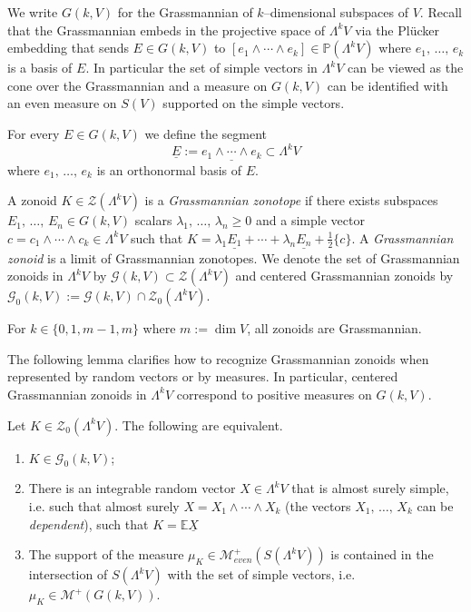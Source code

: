 \documentclass[AHL, Unicode, longabstracts, published]{cedram}
\newcommand{\PP}{\mathbb{P}}
\newcommand{\EE}{\mathbb{E}}
\newcommand{\ZZ}{\mathscr{Z}}
\newcommand{\ZZo}{\mathscr{Z}_0}
\newcommand{\Me}{\mathcal{M}}
\newcommand{\Mev}{\mathcal{M}_{even}}
\newcommand{\GZ}{\mathcal{G}}
\newcommand{\GZo}{\mathcal{G}_0}
\newcommand{\seg}{\underline}
\newcommand*{\romanenumi}{\renewcommand*{\theenumi}{\roman{enumi}}}
\begin{document}
We write $G(k,V)$ for the Grassmannian of $k$--dimensional subspaces of $V$. Recall that the Grassmannian embeds in the projective space of $\Lambda^kV$ via the Pl\"ucker embedding that sends $E\in G(k,V)$ to $[e_1\wedge\cdots\wedge e_k]\in\PP(\Lambda^kV)$ where $e_1,\,\ldots,\,e_k$ is a basis of $E.$ In particular the set of simple vectors in $\Lambda^kV$ can be viewed as the cone over the Grassmannian and a measure on $G(k,V)$ can be identified with an even measure on $S(V)$ supported on the simple vectors.

For every $E\in G(k,V)$ we define the segment
\begin{equation*}
\seg{E}:=\seg{e_1\wedge\cdots\wedge e_k}\subset\Lambda^k V
\end{equation*}
where $e_1,\,\ldots,\,e_k$ is an orthonormal basis of $E.$

\begin{defi}
A zonoid $K\in\ZZ(\Lambda^k V)$ is a \emph{Grassmannian zonotope} if there exists subspaces $E_1,\,\ldots,\,E_n\in G(k,V)$ scalars $\lambda_1,\,\ldots,\,\lambda_n\geq 0$ and a simple vector $c=c_1\wedge\cdots\wedge c_k\in\Lambda^k V$ such that $K=\lambda_1\seg{E_1}+\cdots+\lambda_n\seg{E_n}+\tfrac{1}{2}\{c\}$. A \emph{Grassmannian zonoid} is a limit of Grassmannian zonotopes. We denote the set of Grassmannian zonoids in $\Lambda^k V$ by $\GZ(k,V)\subset \ZZ(\Lambda^k V)$ and centered Grassmannian zonoids by $\GZo(k,V):=\GZ(k,V)\cap \ZZo(\Lambda^k V)$.
\end{defi}

\begin{rema}
For $k\in\{0,1,m-1,m\}$ where $m:=\dim V$, all zonoids are Grassmannian.
\end{rema}



The following lemma clarifies how to recognize Grassmannian zonoids when represented by random vectors or by measures. In particular, centered Grassmannian zonoids in $\Lambda^k V$ correspond to positive measures on $G(k,V)$.

\begin{lemm}\label{lem:GZchar}
Let $K\in \ZZo(\Lambda^k V)$. The following are equivalent.
\begin{enumerate}\romanenumi
\item\label{lemm3.23.1} $K\in\GZo(k,V)$;
\item\label{lemm3.23.2} There is an integrable random vector $X\in\Lambda^k V$ that is almost surely simple, i.e. such that almost surely $X=X_1\wedge\cdots\wedge X_k$ (the vectors $X_1,\,\ldots,\,X_k$ can be \emph{dependent}), such that $K=\EE\seg{X}$
\item\label{lemm3.23.3} The support of the measure $\mu_K\in\Mev^+(S(\Lambda^kV))$ is contained in the intersection of $S(\Lambda^kV)$ with the set of simple vectors, i.e. $\mu_K\in\Me^+(G(k,V))$.
\end{enumerate}
\end{lemm}
\end{document}
